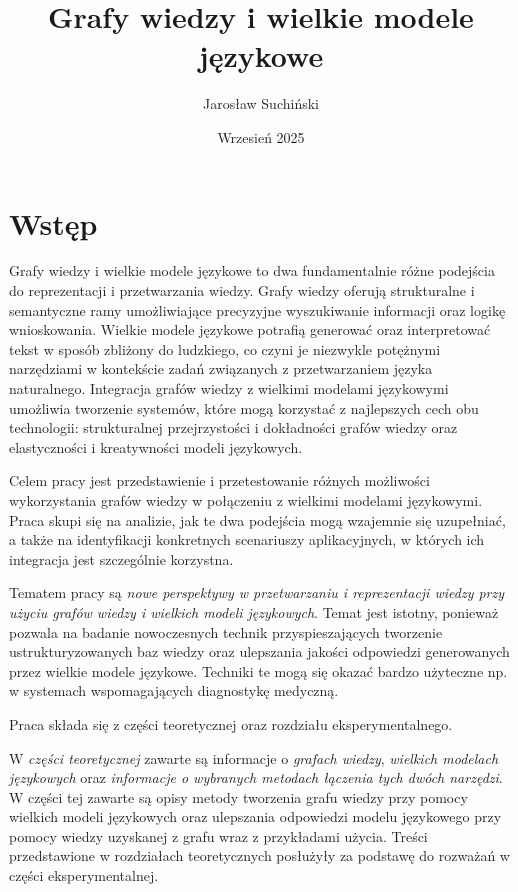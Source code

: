 \documentclass[
a4paper,
12pt,
]{article}
\title{Grafy wiedzy i wielkie modele językowe}
\author{Jarosław Suchiński}
\date{Wrzesień 2025}
\newcommand\blankpage[1][-1]{%
    \newpage%
    \null%
    \thispagestyle{empty}%
    \addtocounter{page}{#1}%
    \newpage%
}
\begin{document}



\tableofcontents \thispagestyle{empty}
\clearpage\newpage

\section{Wstęp}
Grafy wiedzy i wielkie modele językowe to dwa fundamentalnie różne podejścia do reprezentacji i przetwarzania wiedzy. Grafy wiedzy oferują strukturalne i semantyczne ramy umożliwiające precyzyjne wyszukiwanie informacji oraz logikę wnioskowania. Wielkie modele językowe potrafią generować oraz interpretować tekst w sposób zbliżony do ludzkiego, co czyni je niezwykle potężnymi narzędziami w kontekście zadań związanych z przetwarzaniem języka naturalnego. Integracja grafów wiedzy z wielkimi modelami językowymi umożliwia tworzenie systemów, które mogą korzystać z najlepszych cech obu technologii: strukturalnej przejrzystości i dokładności grafów wiedzy oraz elastyczności i kreatywności modeli językowych. 

Celem pracy jest przedstawienie i przetestowanie różnych możliwości wykorzystania grafów wiedzy w połączeniu z wielkimi modelami językowymi. Praca skupi się na analizie, jak te dwa podejścia mogą wzajemnie się uzupełniać, a także na identyfikacji konkretnych scenariuszy aplikacyjnych, w których ich integracja jest szczególnie korzystna.

Tematem pracy są \textit{nowe perspektywy w przetwarzaniu i reprezentacji wiedzy przy użyciu grafów wiedzy i wielkich modeli językowych}. Temat jest istotny, ponieważ pozwala na badanie nowoczesnych technik przyspieszających tworzenie ustrukturyzowanych baz wiedzy oraz ulepszania jakości odpowiedzi generowanych przez wielkie modele językowe. Techniki te mogą się okazać bardzo użyteczne np. w systemach wspomagających diagnostykę medyczną. 

Praca składa się z części teoretycznej oraz rozdziału eksperymentalnego.

W \textit{części teoretycznej} zawarte są informacje o \textit{grafach wiedzy}, \textit{wielkich modelach językowych} oraz \textit{informacje o wybranych metodach łączenia tych dwóch narzędzi}.
W części tej zawarte są opisy metody tworzenia grafu wiedzy przy pomocy wielkich modeli językowych oraz ulepszania odpowiedzi modelu językowego przy pomocy wiedzy uzyskanej z grafu wraz z przykładami użycia.
Treści przedstawione w rozdziałach teoretycznych posłużyły za podstawę do rozważań w części eksperymentalnej.
\end{document}
